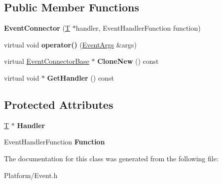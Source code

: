 \subsection*{Public Member Functions}
\begin{DoxyCompactItemize}
\item 
\mbox{\label{class_gost_crypt_1_1_event_connector_ac5648d1a4b4908b1ce77bf4b9b8d2d67}} 
{\bfseries Event\+Connector} (\hyperlink{_stribog_8c_aba2f4c400d7a4c0bf0296be622087314}{T} $\ast$handler, Event\+Handler\+Function function)
\item 
\mbox{\label{class_gost_crypt_1_1_event_connector_ab44cc137bebc82d130fa289be754787c}} 
virtual void {\bfseries operator()} (\hyperlink{struct_gost_crypt_1_1_event_args}{Event\+Args} \&args)
\item 
\mbox{\label{class_gost_crypt_1_1_event_connector_accc45c18101e94451743583acf794417}} 
virtual \hyperlink{class_gost_crypt_1_1_event_connector_base}{Event\+Connector\+Base} $\ast$ {\bfseries Clone\+New} () const
\item 
\mbox{\label{class_gost_crypt_1_1_event_connector_ac91b230e6dab226803e87e49048e00bd}} 
virtual void $\ast$ {\bfseries Get\+Handler} () const
\end{DoxyCompactItemize}
\subsection*{Protected Attributes}
\begin{DoxyCompactItemize}
\item 
\mbox{\label{class_gost_crypt_1_1_event_connector_ac5b8de7e8d89ebd04a0d351b50c52e82}} 
\hyperlink{_stribog_8c_aba2f4c400d7a4c0bf0296be622087314}{T} $\ast$ {\bfseries Handler}
\item 
\mbox{\label{class_gost_crypt_1_1_event_connector_aaab65ab674359c0ce788d61bbe242d67}} 
Event\+Handler\+Function {\bfseries Function}
\end{DoxyCompactItemize}


The documentation for this class was generated from the following file\+:\begin{DoxyCompactItemize}
\item 
Platform/Event.\+h\end{DoxyCompactItemize}
